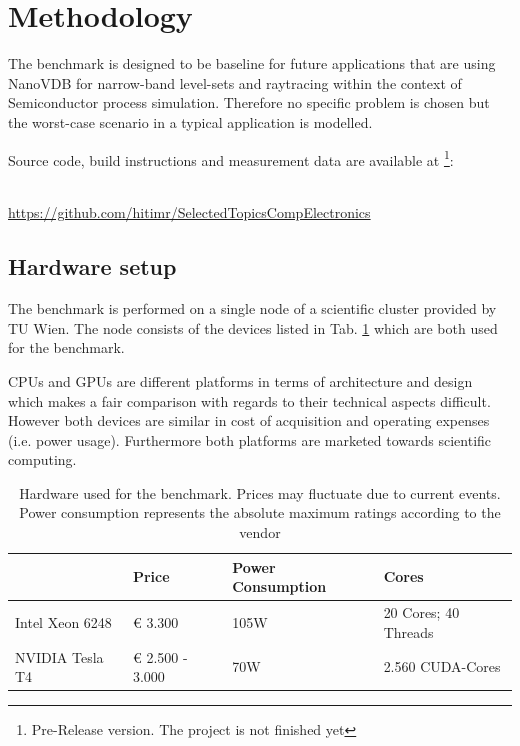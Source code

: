 \setcounter{section}{1}
\section{Methodology}


The benchmark is designed to be baseline for future applications that are using NanoVDB for narrow-band level-sets and raytracing within the context of Semiconductor process simulation.
Therefore no specific problem is chosen but the worst-case scenario in a typical application is modelled.


Source code, build instructions and measurement data are available at \footnote{Pre-Release version. The project is not finished yet}:
\\~\\
\centerline{\url{https://github.com/hitimr/SelectedTopicsCompElectronics}}


\subsection{Hardware setup}
The benchmark is performed on a single node of a scientific cluster provided by TU Wien.
The node consists of the devices listed in Tab. \ref{tab:hardware} which are both used for the benchmark.

CPUs and GPUs are different platforms in terms of architecture and design which makes a fair comparison with regards to their technical aspects difficult.
However both devices are similar in cost of acquisition and operating expenses (i.e. power usage).
Furthermore both platforms are marketed towards scientific computing.


\begin{table}[H]

	\caption{Hardware used for the benchmark. Prices may fluctuate due to current events. Power consumption represents the absolute maximum ratings according to the vendor}
	\centering
	\begin{tabular}{@{}llll@{}}
		\toprule
		                & Price           & Power Consumption & Cores                \\ \hline
		Intel Xeon 6248 & € 3.300         & 105W              & 20 Cores; 40 Threads \\
		NVIDIA Tesla T4 & € 2.500 - 3.000 & 70W               & 2.560 CUDA-Cores     \\ \bottomrule
	\end{tabular}
	\label{tab:hardware}
\end{table}


